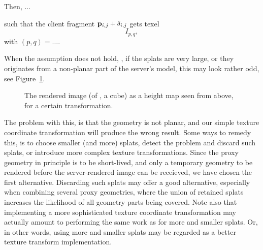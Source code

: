 Then, ...

such that the client fragment $\mathbf{p}_{i, j} + \delta_{i, j}$ gets texel
\[
  I_{p, q},
\]
with $(p, q) = \ldots$.

When the assumption does not hold, \eg, if the splats are very large, or they
originates from a non-planar part of the server's model, this may look rather
odd, see Figure~\ref{fig:LargeSplatsOnCorners}.

\begin{figure}[htb]
  \centering
  \caption{\label{fig:LargeSplatsOnCorners}
           The rendered image (of \eg, a cube) as a height map seen from above,
           for a certain transformation.}
\end{figure}

The problem with this, is that the geometry is not planar, and our simple texture
coordinate transformation will produce the wrong result. Some ways to remedy
this, is to choose smaller (and more) splats, detect the problem and discard
such splats, or introduce more complex texture transformations. Since the proxy
geometry in principle is to be short-lived, and only a temporary geometry to be
rendered before the server-rendered image can be receieved, we have chosen the
first alternative. Discarding such splats may offer a good alternative,
especially when combining several proxy geometries, where the union of retained
splats increases the likelihood of all geometry parts being covered. Note also
that implementing a more sophisticated texture coordinate transformation may
actually amount to performing the same work as for more and smaller splats. Or,
in other words, using more and smaller splats may be regarded as a better
texture transform implementation.


